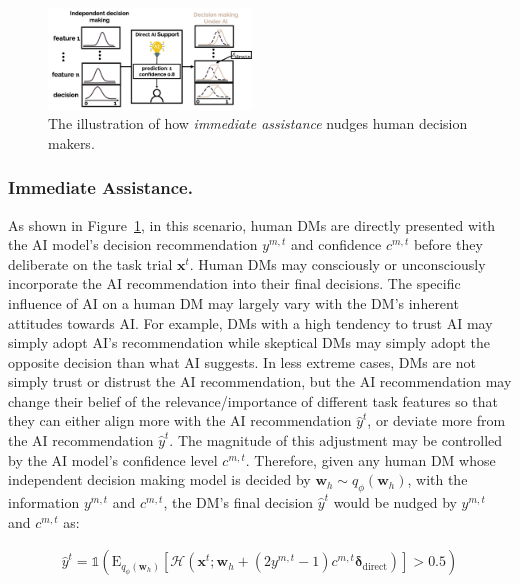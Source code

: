 \documentclass[letterpaper]{article} %
\begin{document}
\begin{figure}[t]
    \centering
        \includegraphics[width=0.48\textwidth]{figures/direct_ai_support.png}
    \caption{The illustration of how \emph{immediate assistance} nudges human decision makers.}
    \label{fig:ill_direct}
\end{figure}


\subsubsection{Immediate Assistance.}
As shown in Figure~\ref{fig:ill_direct}, in this scenario, human DMs are directly presented with the AI model's decision recommendation $y^{m,t}$ and confidence $c^{m,t}$ before they deliberate on the task trial $\bm{x}^t$. Human DMs may consciously or unconsciously incorporate the AI recommendation into their final decisions. The specific influence of AI on a human DM may largely vary with the DM's inherent attitudes towards AI.  %
For example, DMs with a high tendency to trust AI may simply adopt AI's recommendation while skeptical DMs may simply adopt the opposite decision than what AI suggests.
In less extreme cases, DMs are not simply trust or distrust the AI recommendation,
but the AI recommendation may change their belief of the relevance/importance of different task features so that they can either align more with the AI recommendation $\hat{y}^{t}$, or deviate more from the AI recommendation  $\hat{y}^{t}$. The magnitude of this adjustment may be controlled by the AI model's confidence level $c^{m,t}$.
Therefore, given any human DM whose independent decision making model is decided by $\bm{w}_h \sim q_{\phi}(\bm{w}_h)$, with the information $y^{m,t}$ and $c^{m,t}$, the DM's final decision $\hat{y}^{t}$ would be nudged by $y^{m,t}$  and $c^{m,t}$ as:
\begin{small}
\begin{equation}
\begin{split}
      \hat{y}^{t} =
    \mathds{1}(\mathrm{E}_{q_{\phi}(\bm{w}_h)} [\mathcal{H}(\bm{x}^t;\bm{w}_h + (2y^{m,t} -1)c^{m,t}\bm{\delta}_{\text{direct}})]>0.5)
\end{split}
\end{equation}
\end{small}
\end{document}
